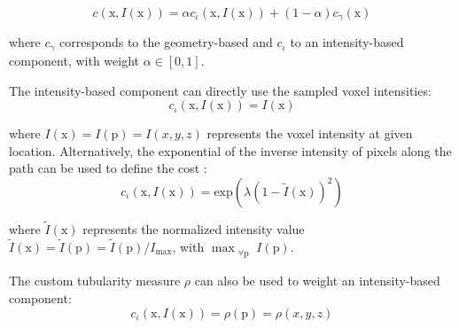 \begin{equation}
c(\mathrm{x}, I(\mathrm{x})) = \alpha c_{\iota}(\mathrm{x}, I(\mathrm{x})) + (1-\alpha) c_{\gamma}(\mathrm{x}) 
\label{ch1_eq4}
\end{equation}

where $c_{\gamma}$ corresponds to the geometry-based and $c_{\iota}$ to an intensity-based component, with weight $ \alpha \in \left[ 0, 1 \right] $. 

The intensity-based component can directly use the sampled voxel intensities:
\begin{equation}
c_{\iota}( \mathrm{x}, I(\mathrm{x}) ) = I(\mathrm{x})
\end{equation}

where $I(\mathrm{x}) = I(\mathrm{p}) = I(x, y, z)$ represents the voxel intensity at given location. Alternatively, the exponential of the inverse intensity of pixels along the path can be used to define the cost \cite{peng2010automatic}:
\begin{equation}
c_{\iota}( \mathrm{x}, I(\mathrm{x}) ) = \text{exp} \left(  \lambda  (1 - \tilde{I}(\mathrm{x}))^2 \right)
\end{equation}

where $\tilde{I}(\mathrm{x})$ represents the normalized intensity value $ \tilde{I}(\mathrm{x}) = \tilde{I}(\mathrm{p}) = \tilde{I}(\mathrm{p}) / I_{\text{max}}$, with $\max_{\substack{\forall \mathrm{p}}} I(\mathrm{p})$.

The custom tubularity measure $\rho$ can also be used to weight an intensity-based component:
\begin{equation}
c_{\iota}( \mathrm{x}, I(\mathrm{x}) ) = \rho(\mathrm{p}) = \rho(x, y, z)
\end{equation}

